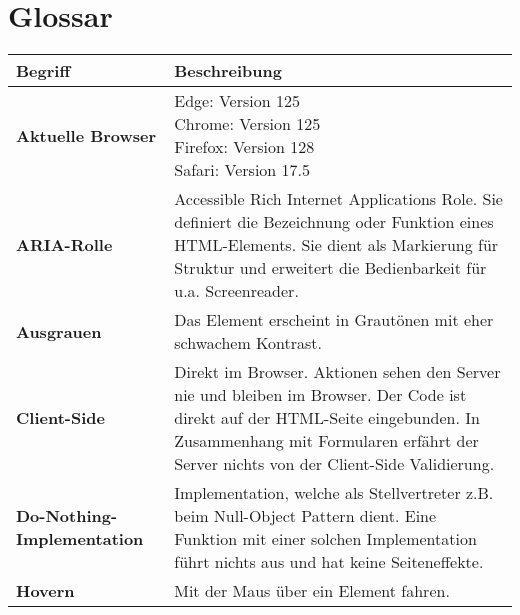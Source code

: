 \chapter{Glossar}
\label{chap:glossary}

\newcommand{\glossarywithTitle}{0.32\textwidth}
\newcommand{\glossarywith}{0.66\textwidth}
\begin{table}[!ht]
    \smallskip 
    \centering
    \footnotesize
    \begin{adjustbox}{max width=\textwidth}
        \begin{threeparttable}
            \begin{tabular}{ p{\glossarywithTitle} | p{\glossarywith} }
                \bf{Begriff} & \bf{Beschreibung} \\
                \hline \hline
                \bf{Aktuelle Browser} & \tbbr{
                    Edge: Version 125 \\
                    Chrome: Version 125 \\
                    Firefox: Version 128 \\
                    Safari: Version 17.5
                } \\
                \hline
                \bf{ARIA-Rolle} & Accessible Rich Internet Applications Role.
                    Sie definiert die Bezeichnung oder Funktion eines HTML-Elements.
                    Sie dient als Markierung für Struktur und erweitert die Bedienbarkeit für u.a. Screenreader. \\
                \hline
                \bf{Ausgrauen} & Das Element erscheint in Grautönen mit eher schwachem Kontrast. \\
                \hline
                \bf{Client-Side} & Direkt im Browser. 
                    Aktionen sehen den Server nie und bleiben im Browser. 
                    Der Code ist direkt auf der HTML-Seite eingebunden. 
                    In Zusammenhang mit Formularen erfährt der Server nichts von der Client-Side Validierung. \\
                \hline
                \bf{Do-Nothing-Implementation} & 
                    Implementation, welche als Stellvertreter z.B. beim Null-Object Pattern dient. 
                    Eine Funktion mit einer solchen Implementation führt nichts aus und hat keine Seiteneffekte. \\
                \hline
                \bf{Hovern} & Mit der Maus über ein Element fahren. \\

\end{tabular}
\end{threeparttable}
\end{adjustbox}
\end{table}
